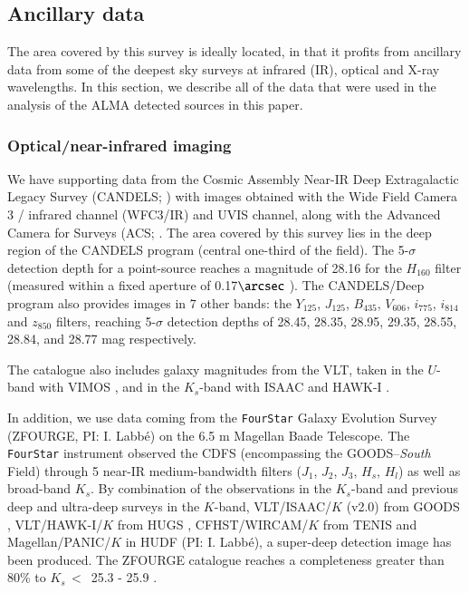 \documentclass[longauth]{aa}
\begin{document}
\subsection{Ancillary data}\label{sec:Ancillary_data}
The area covered by this survey is ideally located, in that it profits from ancillary data from some of the deepest sky surveys at infrared (IR), optical and X-ray wavelengths. In this section, we describe all of the data that were used in the analysis of the ALMA detected sources in this paper.
\subsubsection{Optical/near-infrared imaging}\label{sec:Optical/near-infrared_imaging}
We have supporting data from the Cosmic Assembly Near-IR Deep Extragalactic Legacy Survey (CANDELS; \citealt{Grogin2011}) with images obtained with the Wide Field Camera 3 / infrared channel (WFC3/IR) and UVIS channel, along with the Advanced Camera for Surveys (ACS; \citealt{Koekemoer2011}. The area covered by this survey lies in the deep region of the CANDELS program (central one-third of the field). The 5-$\sigma$ detection depth for a point-source reaches a magnitude of 28.16 for the $H_{160}$ filter (measured within a fixed aperture of 0.17$\arcsec$ \citealt{Guo2013}). The CANDELS/Deep program also provides images in 7 other bands: the $Y_{125}$, $J_{125}$, $B_{435}$, $V_{606}$, $i_{775}$, $i_{814}$ and $z_{850}$ filters, reaching 5-$\sigma$ detection depths of 28.45, 28.35, 28.95, 29.35, 28.55, 28.84, and 28.77 mag respectively.

The \cite{Guo2013} catalogue  also includes galaxy magnitudes from the VLT, taken in the $U$-band with VIMOS \mbox{\citep{Nonino2009}}, and in the $K_s$-band with ISAAC \citep{Retzlaff2010} and HAWK-I \citep{Fontana2014}.

In addition, we use data coming from the \texttt{FourStar} Galaxy Evolution Survey (ZFOURGE, PI: I. Labb\'{e}) on the 6.5 m Magellan Baade Telescope. The \texttt{FourStar} instrument \mbox{\citep{Persson2013}} observed the CDFS (encompassing the GOODS--\textit{South} Field) through 5 near-IR medium-bandwidth filters ($J_1$, $J_2$, $J_3$, $H_s$, $H_l$) as well as broad-band $K_s$. By combination of the  observations in the $K_s$-band and previous deep and ultra-deep surveys in the $K$-band, VLT/ISAAC/$K$ (v2.0) from GOODS \citep{Retzlaff2010}, VLT/HAWK-I/$K$ from HUGS \citep{Fontana2014}, CFHST/WIRCAM/$K$ from TENIS \citep{Hsieh2012} and Magellan/PANIC/$K$ in HUDF (PI: I. Labb\'e), a super-deep detection image has been produced. The ZFOURGE catalogue reaches a completeness greater than 80\% to $K_s$\,$<$\, 25.3 - 25.9 \citep{Straatman2016}.
\end{document}
